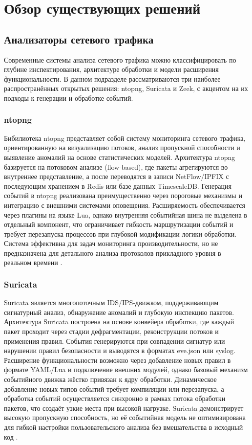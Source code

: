 \section{Обзор существующих решений}
\subsection{Анализаторы сетевого трафика}
Современные системы анализа сетевого трафика можно классифицировать по глубине инспектирования, архитектуре обработки и модели расширения функциональности.
В данном подразделе рассматриваются три наиболее распространённых открытых решения: ntopng, Suricata и Zeek, с акцентом на их подходы к генерации и обработке событий.

\subsubsection{ntopng}
Бибилиотека ntopng представляет собой систему мониторинга сетевого трафика, ориентированную на визуализацию потоков, анализ пропускной способности и выявление аномалий на основе статистических моделей.
Архитектура ntopng базируется на потоковом анализе (flow-based), где пакеты агрегируются во внутреннее представление, а после переводятся в записи NetFlow/IPFIX с последующим хранением в Redis или базе данных TimescaleDB.
Генерация событий в ntopng реализована преимущественно через пороговые механизмы и интеграцию с внешними системами оповещения.
Расширяемость обеспечивается через плагины на языке Lua, однако внутренняя событийная шина не выделена в отдельный компонент, что ограничивает гибкость маршрутизации событий и требует перезапуска процессов при глубокой модификации логики обработки.
Система эффективна для задач мониторинга производительности, но не предназначена для детального анализа протоколов прикладного уровня в реальном времени \cite{ntopng2025doc}.

\subsubsection{Suricata}
Suricata является многопоточным IDS/IPS-движком, поддерживающим сигнатурный анализ, обнаружение аномалий и глубокую инспекцию пакетов.
Архитектура Suricata построена на основе конвейера обработки, где каждый пакет проходит через стадии дефрагментации, реконструкции потоков и применения правил.
События генерируются при совпадении сигнатур или нарушении правил безопасности и выводятся в форматах eve.json или syslog.
Расширение функциональности возможно через добавление новых правил в формате YAML/Lua и подключение внешних модулей, однако базовый механизм событийного движка жёстко привязан к ядру обработки.
Динамическое добавление новых типов событий требует компиляции или перезапуска, а обработка событий осуществляется синхронно в рамках потока обработки пакетов, что создаёт узкие места при высокой нагрузке.
Suricata демонстрирует высокую пропускную способность, но её событийная модель не оптимизирована для гибкой настройки пользовательского анализа без вмешательства в исходный код \cite{suricata2023arch}.

